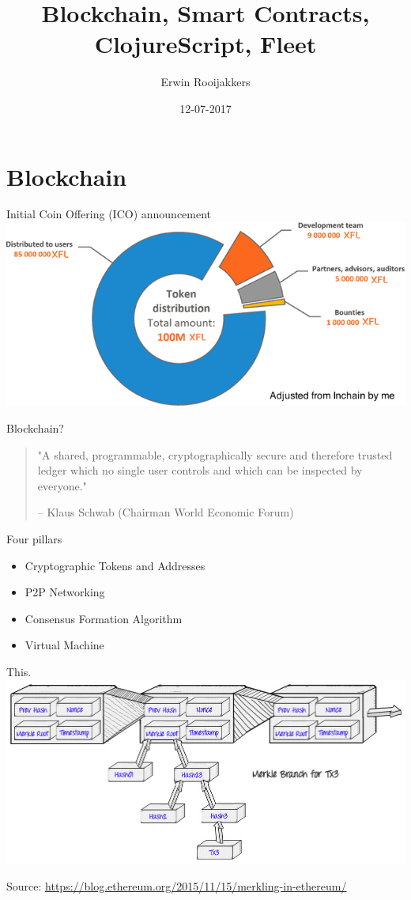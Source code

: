 \documentclass[presentation]{beamer}
\author{Erwin Rooijakkers}
\date{12-07-2017}
\title{Blockchain, Smart Contracts, ClojureScript, Fleet}
\begin{document}
\maketitle

\section{Blockchain}
\label{sec-1}

\begin{frame}[label=sec-1-1]{Initial Coin Offering (ICO) announcement}
\includegraphics[width=.9\linewidth]{../images/ico.png}
\end{frame}
\begin{frame}[label=sec-1-2]{Blockchain?}
\begin{quotation}
"A \alert{shared}, programmable, cryptographically secure and therefore trusted ledger
\alert{which no single user controls} and \alert{which can be inspected by everyone}."

-- Klaus Schwab (Chairman World Economic Forum)
\end{quotation}
\end{frame}

\begin{frame}[label=sec-1-3]{Four pillars}
\begin{itemize}
\item Cryptographic Tokens and Addresses
\item P2P Networking
\item Consensus Formation Algorithm
\item Virtual Machine
\end{itemize}
\end{frame}

\begin{frame}[label=sec-1-4]{This.}
\includegraphics[width=.9\linewidth]{../images/merkle.jpg}

Source: \url{https://blog.ethereum.org/2015/11/15/merkling-in-ethereum/}
\end{frame}
\end{document}
